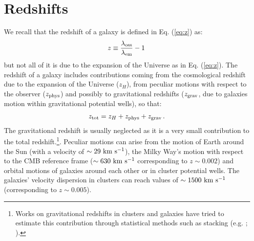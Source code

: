 \section{Redshifts}
We recall that the redshift of a galaxy is defined in Eq. (\ref{eq:z}) as:
\begin{equation}
z\equiv \frac{\lambda_{\rm oss}}{\lambda_{\rm em}}-1\,
\end{equation}
but not all of it is due to the expansion of the Universe as in Eq. (\ref{eq:z}). The redshift of a galaxy includes contributions coming from the cosmological redshift due to the expansion of the Universe ($z_H$), from peculiar motions with respect to the observer ($z_{\rm phys}$) and possibly to gravitational redshifts ($z_{\rm grav}$, due to galaxies motion within gravitational potential wells), so that:
\begin{equation}
z_{\rm tot} = z_H+z_{\rm phys}+z_{\rm grav}\,.
\end{equation}
The gravitational redshift is usually neglected as it is a very small contribution to the total redshift.\footnote{Works on gravitational redshifts in clusters and galaxies have tried to estimate this contribution through statistical methods such as stacking (e.g. \citealt{wojtak}; \citealt{sadeh15}).}. Peculiar motions can arise from the motion of Earth around the Sun (with a velocity of $\sim 29~{\rm km~s^{-1}}$), the Milky Way's motion with respect to the CMB reference frame ($\sim 630 ~{\rm km~s^{-1}}$ corresponding to $z \sim 0.002$) and orbital motions of galaxies around each other or in cluster potential wells. The galaxies' velocity dispersion in clusters can reach values of $\sim 1500 ~{\rm km~s^{-1}}$ (corresponding to $z\sim 0.005$).

